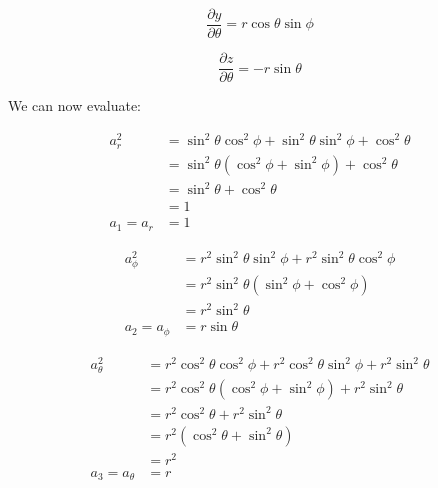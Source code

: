 \documentclass[letterpaper,12pt]{article}
\begin{document}
\begin{equation}
    \frac{\partial y}{\partial \theta} = r \cos{\theta} \sin{\phi}
\end{equation}

\begin{equation}
    \frac{\partial z}{\partial \theta} = -r \sin{\theta}
\end{equation}

We can now evaluate:

\begin{equation}
\begin{aligned}
     a^{2}_{r} &= \sin^2{\theta} \cos^2{\phi} + \sin^2{\theta} \sin^2{\phi} + \cos^2{\theta} \\
               &= \sin^2{\theta} (\cos^2{\phi} + \sin^2{\phi}) + \cos^2{\theta} \\
               &= \sin^2{\theta} + \cos^2{\theta} \\
               &= 1 \\
     a_1 = a_r &= 1
\end{aligned}
\end{equation}

\begin{equation}
\begin{aligned}
    a^{2}_{\phi}   &= r^2 \sin^2{\theta} \sin^2{\phi} + r^2 \sin^2{\theta} \cos^2{\phi} \\
                   &= r^2 \sin^2{\theta} (\sin^2{\phi} + \cos^2{\phi}) \\
                   &= r^2 \sin^2{\theta} \\
    a_2 = a_{\phi} &= r \sin{\theta}
\end{aligned}
\end{equation}

\begin{equation}
\begin{aligned}
    a^{2}_{\theta}   &= r^2 \cos^2{\theta} \cos^2{\phi} + r^2 \cos^2{\theta} \sin^2{\phi} + r^2 \sin^2{\theta} \\
                     &= r^2 \cos^2{\theta} (\cos^2{\phi} + \sin^2{\phi}) + r^2 \sin^2{\theta} \\
                     &= r^2 \cos^2{\theta} + r^2 \sin^2{\theta} \\
                     &= r^2 (\cos^2{\theta} + \sin^2{\theta}) \\
                     &= r^2 \\
    a_3 = a_{\theta} &= r       
\end{aligned}
\end{equation}
\end{document}
